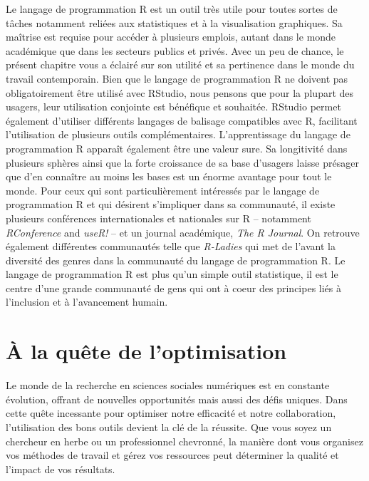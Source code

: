 \documentclass[
  letterpaper,
]{scrbook}
\begin{document}
Le langage de programmation R est un outil très utile pour toutes sortes
de tâches notamment reliées aux statistiques et à la visualisation
graphiques. Sa maîtrise est requise pour accéder à plusieurs emplois,
autant dans le monde académique que dans les secteurs publics et privés.
Avec un peu de chance, le présent chapitre vous a éclairé sur son
utilité et sa pertinence dans le monde du travail contemporain. Bien que
le langage de programmation R ne doivent pas obligatoirement être
utilisé avec RStudio, nous pensons que pour la plupart des usagers, leur
utilisation conjointe est bénéfique et souhaitée. RStudio permet
également d'utiliser différents langages de balisage compatibles avec R,
facilitant l'utilisation de plusieurs outils complémentaires.
L'apprentissage du langage de programmation R apparaît également être
une valeur sure. Sa longitivité dans plusieurs sphères ainsi que la
forte croissance de sa base d'usagers laisse présager que d'en connaître
au moins les bases est un énorme avantage pour tout le monde. Pour ceux
qui sont particulièrement intéressés par le langage de programmation R
et qui désirent s'impliquer dans sa communauté, il existe plusieurs
conférences internationales et nationales sur R -- notamment
\emph{RConference} and \emph{useR!} -- et un journal académique,
\emph{The R Journal}. On retrouve également différentes communautés
telle que \emph{R-Ladies} qui met de l'avant la diversité des genres
dans la communauté du langage de programmation R. Le langage de
programmation R est plus qu'un simple outil statistique, il est le
centre d'une grande communauté de gens qui ont à coeur des principes
liés à l'inclusion et à l'avancement humain.


\hypertarget{sec-chap3}{%
\chapter{À la quête de l'optimisation}\label{sec-chap3}}

Le monde de la recherche en sciences sociales numériques est en
constante évolution, offrant de nouvelles opportunités mais aussi des
défis uniques. Dans cette quête incessante pour optimiser notre
efficacité et notre collaboration, l'utilisation des bons outils devient
la clé de la réussite. Que vous soyez un chercheur en herbe ou un
professionnel chevronné, la manière dont vous organisez vos méthodes de
travail et gérez vos ressources peut déterminer la qualité et l'impact
de vos résultats.
\end{document}
